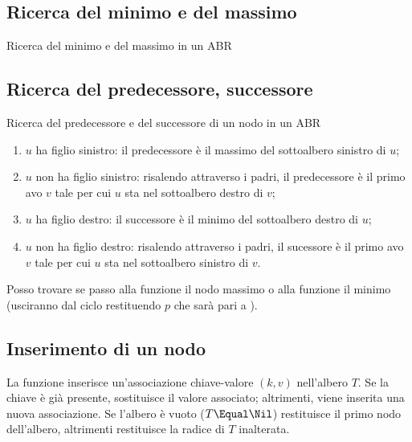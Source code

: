 \subsection*{Ricerca del minimo e del massimo}

\begin{algorithm}[H]
	\caption{Ricerca del minimo e del massimo in un \textsc{ABR}}
	
\end{algorithm}

\subsection*{Ricerca del predecessore, successore}

\begin{algorithm}[H]
	\caption{Ricerca del predecessore e del successore di un nodo in un \textsc{ABR}}
	
\end{algorithm}

\begin{enumerate}[label={\footnotesize\ttfamily (\arabic*)}]
	\item \(u\) ha figlio sinistro: il predecessore è il massimo del sottoalbero sinistro di \(u\);
	\item \(u\) non ha figlio sinistro: risalendo attraverso i padri, il predecessore è il primo avo \(v\) tale per cui \(u\) sta nel sottoalbero destro di \(v\);
	\item \(u\) ha figlio destro: il successore è il minimo del sottoalbero destro di \(u\);
	\item \(u\) non ha figlio destro: risalendo attraverso i padri, il sucessore è il primo avo \(v\) tale per cui \(u\) sta nel sottoalbero sinistro di \(v\).
\end{enumerate}

\begin{note}
Posso trovare \Nil se passo alla funzione \succNode il nodo massimo o alla funzione \predNode il minimo (usciranno dal ciclo restituendo \(p\) che sarà pari a \Nil).
\end{note}

\clearpage
\subsection*{Inserimento di un nodo}

La funzione \insertNode inserisce un'associazione chiave-valore \((k,v)\) nell'albero \(T\).
Se la chiave è già presente, sostituisce il valore associato;
altrimenti, viene inserita una nuova associazione.
Se l'albero è vuoto (\(T \Equal \Nil\)) restituisce il primo nodo dell'albero, altrimenti restituisce la radice di \(T\) inalterata.

